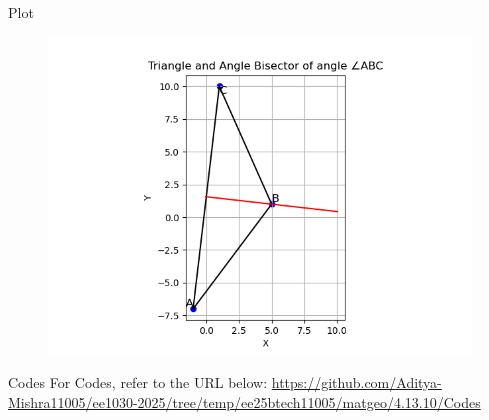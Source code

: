 \documentclass{beamer}
\begin{document}
\begin{frame}{Plot}
\begin{figure}
    \centering
    \includegraphics[width=0.8\columnwidth]{Figs/Figure_1.png}
\end{figure}
\end{frame}
\begin{frame}{Codes}
\centering
For Codes, refer to the URL below:  
\url{https://github.com/Aditya-Mishra11005/ee1030-2025/tree/temp/ee25btech11005/matgeo/4.13.10/Codes}
\end{frame}
\end{document}
